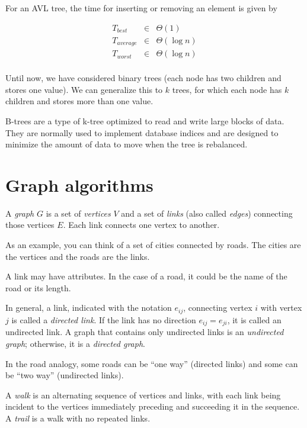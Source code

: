 \documentclass[justified,sixbynine]{tufte-book}
\theoremstyle{plain}%
\theoremstyle{definition}
\theoremstyle{remark}
\begin{document}
\begin{fullwidth}
For an AVL tree, the time for inserting or removing an element is given by

\begin{eqnarray}
T_{best} &\in &\Theta (1) \\
T_{average} &\in &\Theta (\log n) \\
T_{worst} &\in &\Theta (\log n) \\
\end{eqnarray}


Until now, we have considered binary trees (each node has two children and
stores one value). We can generalize this to $k$ trees, for which each node has $k$
children and stores more than one value.

B-trees are a type of k-tree optimized to read and write large blocks of data. They are normally used to implement database indices and are designed to minimize the amount of data to move when the tree is rebalanced.

\goodbreak\section{Graph algorithms}


A {\it graph} $G$ is a set of {\it vertices} $V$ and a set of {\it links} (also called {\it edges}) connecting those vertices $E$. Each link connects one vertex to another.

As an example, you can think of a set of cities connected by roads. The cities are the vertices and the roads are the links.

A link may have attributes. In the case of a road, it could be the name of the road or its length.

In general, a link, indicated with the notation $e_{ij}$, connecting vertex $%
i $ with vertex $j$ is called a {\it directed link}. If the link has no
direction $e_{ij}=e_{ji}$, it is called an undirected link. A graph that
contains only undirected links is an {\it undirected graph}; otherwise, it is
a {\it directed graph}.

In the road analogy, some roads can be ``one way'' (directed links) and some can be ``two way'' (undirected links).

A {\it walk} is an alternating sequence of vertices and links, with each
link being incident to the vertices immediately preceding and succeeding it
in the sequence. A {\it trail} is a walk with no repeated links.


\end{fullwidth}
\end{document}
